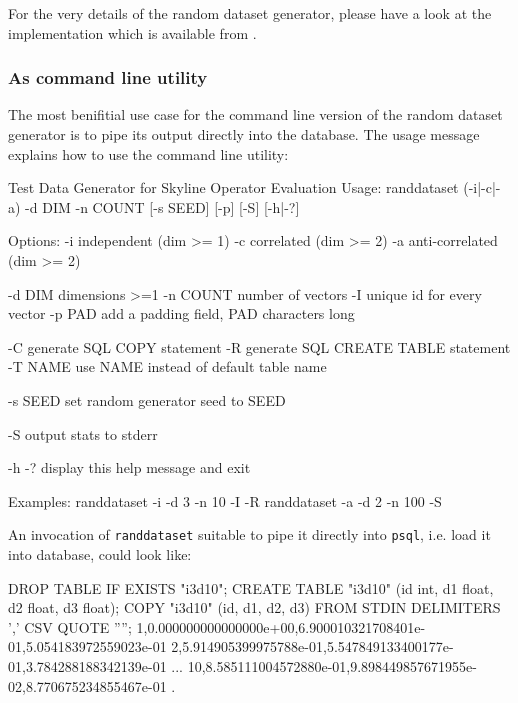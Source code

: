 For the very details of the random dataset generator, please have a
look at the implementation which is available from \citep{Eder2007a}.

\subsubsection{As command line utility}

The most benifitial use case for the command line version of the
random dataset generator is to pipe its output directly into the
database. The usage message explains how to use the command line
utility:

\begin{shellscript}
Test Data Generator for Skyline Operator Evaluation
Usage: randdataset (-i|-c|-a) -d DIM -n COUNT [-s SEED] [-p] [-S] [-h|-?]

Options:
       -i       independent (dim >= 1)
       -c       correlated (dim >= 2)
       -a       anti-correlated (dim >= 2)

       -d DIM   dimensions >=1
       -n COUNT number of vectors
       -I       unique id for every vector
       -p PAD   add a padding field, PAD characters long

       -C       generate SQL COPY statement
       -R       generate SQL CREATE TABLE statement
       -T NAME  use NAME instead of default table name

       -s SEED  set random generator seed to SEED

       -S       output stats to stderr

       -h -?    display this help message and exit

Examples:
       randdataset -i -d 3 -n 10 -I -R
       randdataset -a -d 2 -n 100 -S
\end{shellscript}

An invocation of \texttt{randdataset} suitable to pipe it directly
into \texttt{psql}, i.e. load it into database, could look like:

\begin{shellscript}
DROP TABLE IF EXISTS "i3d10";
CREATE TABLE "i3d10" (id int, d1 float, d2 float, d3 float);
COPY "i3d10" (id, d1, d2, d3) FROM STDIN DELIMITERS ',' CSV QUOTE '''';
1,0.000000000000000e+00,6.900010321708401e-01,5.054183972559023e-01
2,5.914905399975788e-01,5.547849133400177e-01,3.784288188342139e-01
...
10,8.585111004572880e-01,9.898449857671955e-02,8.770675234855467e-01
\ttbackslash.
\end{shellscript}

